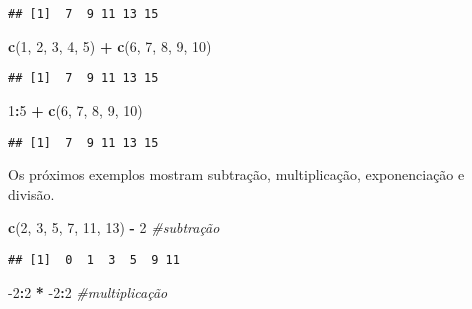 \documentclass[]{book}
\newenvironment{Shaded}{\begin{snugshade}}{\end{snugshade}}
\newcommand{\CommentTok}[1]{\textcolor[rgb]{0.56,0.35,0.01}{\textit{#1}}}
\newcommand{\DecValTok}[1]{\textcolor[rgb]{0.00,0.00,0.81}{#1}}
\newcommand{\KeywordTok}[1]{\textcolor[rgb]{0.13,0.29,0.53}{\textbf{#1}}}
\newcommand{\NormalTok}[1]{#1}
\newcommand{\OperatorTok}[1]{\textcolor[rgb]{0.81,0.36,0.00}{\textbf{#1}}}
\newcommand{\StringTok}[1]{\textcolor[rgb]{0.31,0.60,0.02}{#1}}
\theoremstyle{definition}
\theoremstyle{definition}
\theoremstyle{definition}
\theoremstyle{remark}
\begin{document}
\begin{verbatim}
## [1]  7  9 11 13 15
\end{verbatim}

\begin{Shaded}
\begin{Highlighting}[]
\KeywordTok{c}\NormalTok{(}\DecValTok{1}\NormalTok{, }\DecValTok{2}\NormalTok{, }\DecValTok{3}\NormalTok{, }\DecValTok{4}\NormalTok{, }\DecValTok{5}\NormalTok{) }\OperatorTok{+}\StringTok{ }\KeywordTok{c}\NormalTok{(}\DecValTok{6}\NormalTok{, }\DecValTok{7}\NormalTok{, }\DecValTok{8}\NormalTok{, }\DecValTok{9}\NormalTok{, }\DecValTok{10}\NormalTok{)}
\end{Highlighting}
\end{Shaded}

\begin{verbatim}
## [1]  7  9 11 13 15
\end{verbatim}

\begin{Shaded}
\begin{Highlighting}[]
\DecValTok{1}\OperatorTok{:}\DecValTok{5} \OperatorTok{+}\StringTok{ }\KeywordTok{c}\NormalTok{(}\DecValTok{6}\NormalTok{, }\DecValTok{7}\NormalTok{, }\DecValTok{8}\NormalTok{, }\DecValTok{9}\NormalTok{, }\DecValTok{10}\NormalTok{)}
\end{Highlighting}
\end{Shaded}

\begin{verbatim}
## [1]  7  9 11 13 15
\end{verbatim}

Os próximos exemplos mostram subtração, multiplicação, exponenciação e divisão.

\begin{Shaded}
\begin{Highlighting}[]
\KeywordTok{c}\NormalTok{(}\DecValTok{2}\NormalTok{, }\DecValTok{3}\NormalTok{, }\DecValTok{5}\NormalTok{, }\DecValTok{7}\NormalTok{, }\DecValTok{11}\NormalTok{, }\DecValTok{13}\NormalTok{) }\OperatorTok{-}\StringTok{ }\DecValTok{2}       \CommentTok{#subtração}
\end{Highlighting}
\end{Shaded}

\begin{verbatim}
## [1]  0  1  3  5  9 11
\end{verbatim}

\begin{Shaded}
\begin{Highlighting}[]
\DecValTok{-2}\OperatorTok{:}\DecValTok{2} \OperatorTok{*}\StringTok{ }\DecValTok{-2}\OperatorTok{:}\DecValTok{2}                     \CommentTok{#multiplicação}
\end{Highlighting}
\end{Shaded}
\end{document}
